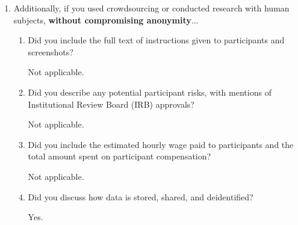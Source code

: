 \documentclass[letterpaper]{article} %
\newcommand{\answerTODO}[1]{#1}
\begin{document}
\begin{enumerate}
\begin{enumerate}
    \answerTODO{Yes.}

  \item Did you mention the license of the assets?
    
    \answerTODO{Yes, where applicable and available.}

  \item Did you include any new assets in the supplemental material or as a URL?
    
    \answerTODO{Yes, subject to platform terms and privacy constraints.}

  \item Did you discuss whether and how consent was obtained from people whose data you're using/curating?
    
    \answerTODO{Yes. The study uses publicly available social media data and does not involve direct interaction with users.}

  \item Did you discuss whether the data you are using/curating contains personally identifiable information or offensive content?
    
    \answerTODO{Yes.}

  \item If you are curating or releasing new datasets, did you discuss how you intend to make your datasets FAIR (see \citet{fair})?
    
    \answerTODO{Not applicable.}

  \item If you are curating or releasing new datasets, did you create a Datasheet for the Dataset (see \citet{gebru2021datasheets})?
    
    \answerTODO{Not applicable.}
\end{enumerate}

\item Additionally, if you used crowdsourcing or conducted research with human subjects, \textbf{without compromising anonymity}...
\begin{enumerate}
  \item Did you include the full text of instructions given to participants and screenshots?
    
    \answerTODO{Not applicable.}

  \item Did you describe any potential participant risks, with mentions of Institutional Review Board (IRB) approvals?
    
    \answerTODO{Not applicable.}

  \item Did you include the estimated hourly wage paid to participants and the total amount spent on participant compensation?
    
    \answerTODO{Not applicable.}

  \item Did you discuss how data is stored, shared, and deidentified?
    
    \answerTODO{Yes.}
\end{enumerate}

\end{enumerate}
\end{document}
